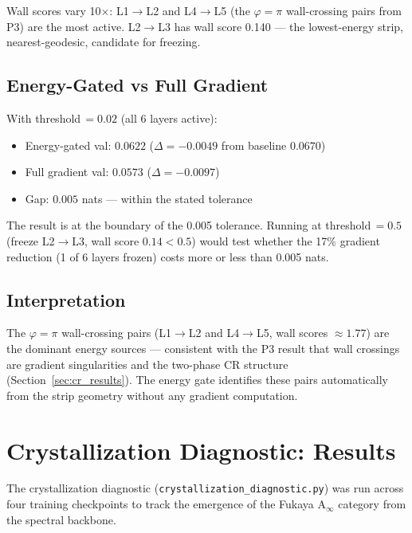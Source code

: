 \documentclass[11pt]{amsart}
\begin{document}
Wall scores vary 10$\times$: L1$\to$L2 and L4$\to$L5
(the $\varphi=\pi$ wall-crossing pairs from P3) are the most active.
L2$\to$L3 has wall score 0.140 --- the lowest-energy strip,
nearest-geodesic, candidate for freezing.

\subsection{Energy-Gated vs Full Gradient}

With threshold\,$=0.02$ (all 6 layers active):
\begin{itemize}
\item Energy-gated val: $0.0622$ ($\Delta = -0.0049$ from baseline $0.0670$)
\item Full gradient val: $0.0573$ ($\Delta = -0.0097$)
\item Gap: $0.005$ nats --- within the stated tolerance
\end{itemize}

The result is at the boundary of the 0.005 tolerance.
Running at threshold\,$=0.5$ (freeze L2$\to$L3, wall score $0.14 < 0.5$)
would test whether the 17\% gradient reduction (1 of 6 layers frozen)
costs more or less than 0.005 nats.

\subsection{Interpretation}

The $\varphi=\pi$ wall-crossing pairs (L1$\to$L2 and L4$\to$L5,
wall scores $\approx 1.77$) are the dominant energy sources ---
consistent with the P3 result that wall crossings are gradient
singularities and the two-phase CR structure (Section~\ref{sec:cr_results}).
The energy gate identifies these pairs automatically from the strip
geometry without any gradient computation.

\section{Crystallization Diagnostic: Results}
\label{sec:crystallization_results}

The crystallization diagnostic (\texttt{crystallization\_diagnostic.py})
was run across four training checkpoints to track the emergence of
the Fukaya A$_\infty$ category from the spectral backbone.
\end{document}
